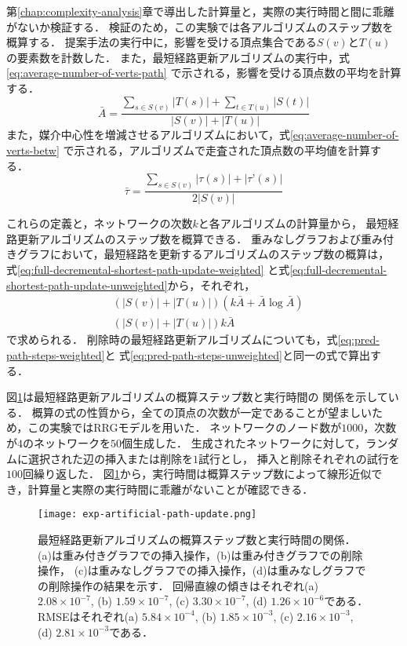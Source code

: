 第\ref{chap:complexity-analysis}章で導出した計算量と，実際の実行時間と間に乖離がないか検証する．
検証のため，この実験では各アルゴリズムのステップ数を概算する．
提案手法の実行中に，影響を受ける頂点集合である$S(v)$と$T(u)$の要素数を計数した．
また，最短経路更新アルゴリズムの実行中，式\eqref{eq:average-number-of-verts-path}
で示される，影響を受ける頂点数の平均を計算する．
\begin{equation}
  \bar{A}=\frac{\sum_{s\in S(v)}|T(s)|+\sum_{t\in T(u)}|S(t)|}{|S(v)|+|T(u)|}
  \label{eq:average-number-of-verts-path}
\end{equation}
また，媒介中心性を増減させるアルゴリズムにおいて，式\eqref{eq:average-number-of-verts-betw}
で示される，アルゴリズムで走査された頂点数の平均値を計算する．
\begin{equation}
  \bar{\tau}=\frac{\sum_{s\in S(v)}|\tau(s)|+|\tau’(s)|}{2|S(v)|}
  \label{eq:average-number-of-verts-betw}
\end{equation}

これらの定義と，ネットワークの次数$k$と各アルゴリズムの計算量から，
最短経路更新アルゴリズムのステップ数を概算できる．
重みなしグラフおよび重み付きグラフにおいて，最短経路を更新するアルゴリズムのステップ数の概算は，
式\eqref{eq:full-decremental-shortest-path-update-weighted}
と式\eqref{eq:full-decremental-shortest-path-update-unweighted}から，それぞれ，
\begin{align}
  &(|S(v)|+|T(u)|)(k\bar{A}+\bar{A}\log\bar{A})
  \label{eq:pred-path-steps-weighted} \\
  &(|S(v)|+|T(u)|)k\bar{A}
  \label{eq:pred-path-steps-unweighted}
\end{align}
で求められる．
削除時の最短経路更新アルゴリズムについても，式\ref{eq:pred-path-steps-weighted}と
式\ref{eq:pred-path-steps-unweighted}と同一の式で算出する．

図\ref{fig:exp-artificial-path-update}は最短経路更新アルゴリズムの概算ステップ数と実行時間の
関係を示している．
概算の式の性質から，全ての頂点の次数が一定であることが望ましいため，この実験ではRRGモデルを用いた．
ネットワークのノード数が$1000$，次数が$4$のネットワークを$50$個生成した．
生成されたネットワークに対して，ランダムに選択された辺の挿入または削除を$1$試行とし，
挿入と削除それぞれの試行を$100$回繰り返した．
図\ref{fig:exp-artificial-path-update}から，実行時間は概算ステップ数によって線形近似でき，計算量と実際の実行時間に乖離がないことが確認できる．

\begin{figure}
  \centering
  \texttt{[image: exp-artificial-path-update.png]}
  \caption{
    最短経路更新アルゴリズムの概算ステップ数と実行時間の関係．
    (a)は重み付きグラフでの挿入操作，(b)は重み付きグラフでの削除操作，
    (c)は重みなしグラフでの挿入操作，(d)は重みなしグラフでの削除操作の結果を示す．
    回帰直線の傾きはそれぞれ(a) $2.08\times10^{-7}$, (b) $1.59\times10^{-7}$,
    (c) $3.30\times10^{-7}$, (d) $1.26\times10^{-6}$である．
    RMSEはそれぞれ(a) $5.84\times10^{-4}$, (b) $1.85\times10^{-3}$,
    (c) $2.16\times10^{-3}$, (d) $2.81\times10^{-3}$である．
  }
  \label{fig:exp-artificial-path-update}
\end{figure}


